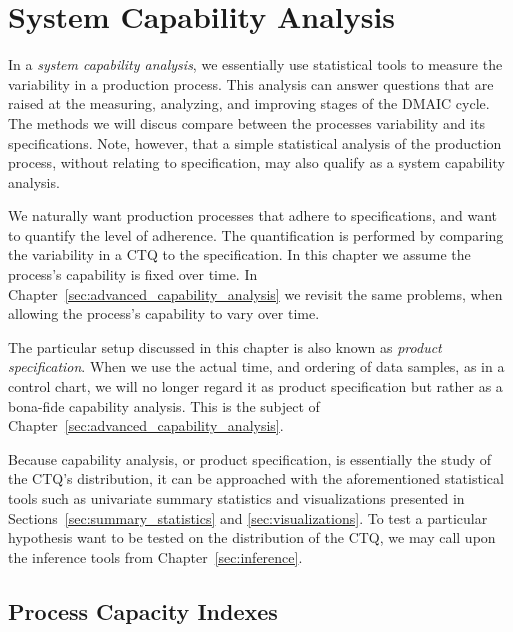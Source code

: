 \chapter{System Capability Analysis}
\label{sec:capability_analysis}

In a \emph{system capability analysis}, we essentially use statistical tools to measure the variability in a production process.
This analysis can answer questions that are raised at the measuring, analyzing, and improving stages of the DMAIC cycle. 
The methods we will discus compare between the processes variability and its specifications. 
Note, however, that a simple statistical analysis of the production process, without relating to specification, may also qualify as a system capability analysis.

We naturally want production processes that adhere to specifications, and want to quantify the level of adherence.
The quantification is performed by comparing the variability in a CTQ to the specification.
In this chapter we assume the process’s capability is fixed over time. 
In Chapter~\ref{sec:advanced_capability_analysis} we revisit the same problems, when allowing the process’s capability to vary over time. 

The particular setup discussed in this chapter is also known as \emph{product specification}.
When we use the actual time, and ordering of data samples, as in a control chart, we will no longer regard it as product specification but rather as a bona-fide capability analysis. This is the subject of Chapter~\ref{sec:advanced_capability_analysis}.



 
 
 
Because capability analysis, or product specification, is essentially the study of the CTQ's distribution, it can be approached with the aforementioned statistical tools such as univariate summary statistics and visualizations presented in Sections~\ref{sec:summary_statistics} and \ref{sec:visualizations}.
To test a particular hypothesis want to be tested on the distribution of the CTQ, we may call upon the inference tools from Chapter~\ref{sec:inference}.




\section{Process Capacity Indexes}

